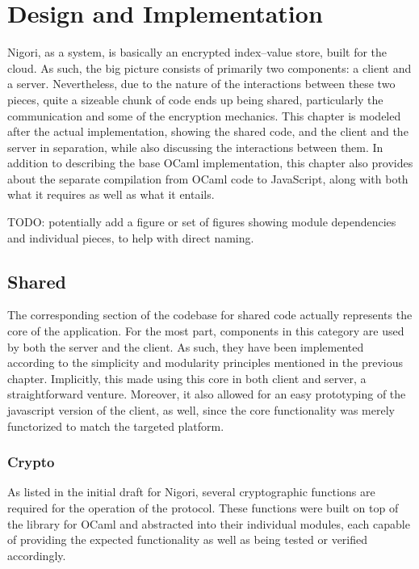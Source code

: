 \chapter{Design and Implementation} \label{chapter:implementation}
Nigori, as a system, is basically an encrypted index--value store, built for the cloud.
As such, the big picture consists of primarily two components: a client and a server.
Nevertheless, due to the nature of the interactions between these two pieces, quite a sizeable chunk of code ends up being shared, particularly the communication and some of the encryption mechanics.
This chapter is modeled after the actual implementation, showing the shared code, and the client and the server in separation, while also discussing the interactions between them.
In addition to describing the base OCaml implementation, this chapter also provides about the separate compilation from OCaml code to JavaScript, along with both what it requires as well as what it entails.

TODO: potentially add a figure or set of figures showing module dependencies and individual pieces, to help with direct naming.

\section{Shared}
The corresponding section of the codebase for shared code actually represents the core of the application.
For the most part, components in this category are used by both the server and the client.
As such, they have been implemented according to the simplicity and modularity principles mentioned in the previous chapter.
Implicitly, this made using this core in both client and server, a straightforward venture.
Moreover, it also allowed for an easy prototyping of the javascript version of the client, as well, since the core functionality was merely functorized to match the targeted platform.

\subsection{Crypto}
As listed in the initial draft for Nigori, several cryptographic functions are required for the operation of the protocol.
These functions were built on top of the  library for OCaml and abstracted into their individual modules, each capable of providing the expected functionality as well as being tested or verified accordingly.

